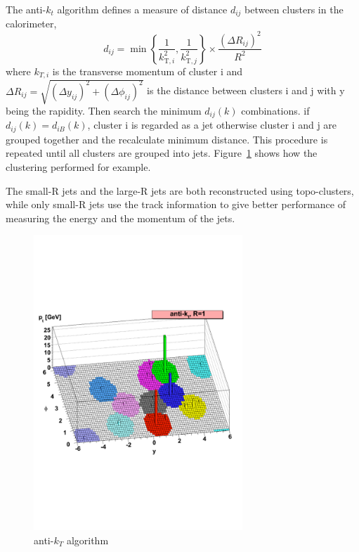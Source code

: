 The anti-$k_t$ algorithm defines a measure of distance $d_{ij}$ between clusters in the calorimeter,
\begin{equation}
d_{i j}=\min \left\{\frac{1}{k_{\mathrm{T}, i}^{2}}, \frac{1}{k_{\mathrm{T}, j}^{2}}\right\} \times \frac{\left(\Delta R_{i j}\right)^{2}}{R^{2}}
\end{equation}
where $k_{T,i}$ is the transverse momentum of cluster i and $\Delta R_{i j}=\sqrt{\left(\Delta y_{i j}\right)^{2}+\left(\Delta \phi_{i j}\right)^{2}}$ is the distance between clusters i and j with y being the rapidity. Then search the minimum $d_{i j}(k)$ combinations. if $d_{i j}(k) = d_{i B}(k)$, cluster i is regarded as a jet otherwise cluster i and j are grouped together and the recalculate minimum distance. This procedure is repeated until all clusters are grouped into jets.
Figure~\ref{fig:antikt} shows how the clustering performed for example.

The small-R jets and the large-R jets are both reconstructed using topo-clusters, while only small-R jets use the track information to give better performance of measuring the energy and the momentum of the jets.

\begin{figure}[tbp]
\begin{center}
 \includegraphics[width=0.70\textwidth,keepaspectratio]{figures/Reconstruction/antikt}
\caption{
anti-$k_T$ algorithm \cite{Cacciari_2008}
}
\label{fig:antikt}
\end{center}
\end{figure}

